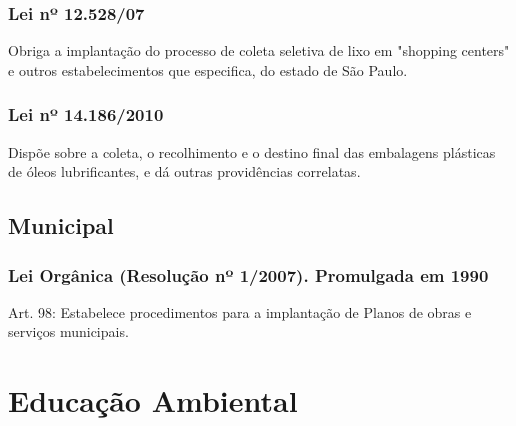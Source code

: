 \begin{subapend}
\begin{subsubapend}
		\subsubsection{Lei nº 12.528/07}
		Obriga a implantação do processo de coleta seletiva de lixo em "shopping centers" e outros estabelecimentos que especifica, do estado de São Paulo.
		\subsubsection{Lei nº 14.186/2010}
		Dispõe sobre a coleta, o recolhimento e o destino final das embalagens plásticas de óleos lubrificantes, e dá outras providências correlatas.
	\end{subsubapend}
\end{subapend}

\begin{subapend}
	\subsection{Municipal}
	\begin{subsubapend}
		\item \subsubsection{Lei Orgânica (Resolução nº 1/2007). Promulgada em 1990}                               
		Art. 98: Estabelece procedimentos para a implantação de Planos de obras e serviços municipais.
	\end{subsubapend}
\end{subapend}


                                
\section{Educação Ambiental}

